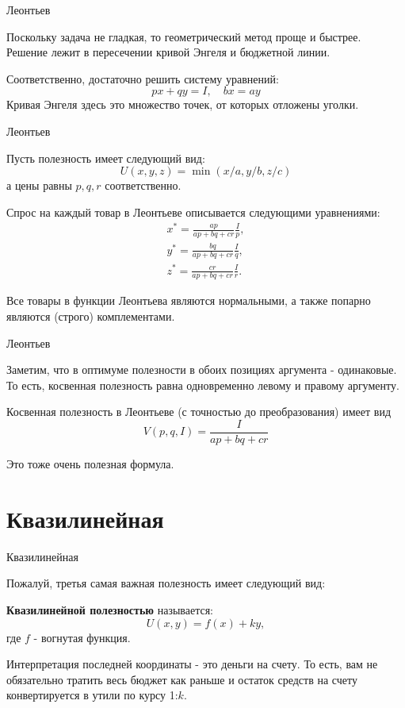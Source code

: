 \documentclass{beamer}
\begin{document}
\begin{frame}{Леонтьев}

Поскольку задача не гладкая, то геометрический метод проще и быстрее. Решение лежит в пересечении кривой Энгеля и бюджетной линии. 

Соответственно, достаточно решить систему уравнений:
$$ px + qy = I, \quad b x = a y$$
Кривая Энгеля здесь это множество точек, от которых отложены уголки.

\end{frame}

\begin{frame}{Леонтьев}

Пусть полезность имеет следующий вид:
$$U(x,y,z) = \min(x/a, y/b, z/c)$$ 
а цены равны $p, q, r$ соответственно. 

Спрос на каждый товар в Леонтьеве описывается следующими уравнениями:
\begin{gather*}
x^{\ast} = \frac{ap}{ap + bq + cr} \frac{I}{p}, \\
y^{\ast} = \frac{bq}{ap + bq + cr} \frac{I}{q}, \\
z^{\ast} = \frac{cr}{ap + bq + cr} \frac{I}{r}.
\end{gather*}

Все товары в функции Леонтьева являются нормальными, а также попарно являются (строго) комплементами.

\end{frame}

\begin{frame}{Леонтьев}

Заметим, что в оптимуме полезности в обоих позициях аргумента - одинаковые. То есть, косвенная полезность равна одновременно левому и правому аргументу.


Косвенная полезность в Леонтьеве (с точностью до преобразования) имеет вид
$$V(p,q,I) = \frac{I}{ap + bq + cr}$$

Это тоже очень полезная формула.

\end{frame}

\section{Квазилинейная}

\begin{frame}{Квазилинейная}

Пожалуй, третья самая важная полезность имеет следующий вид:

\begin{definition}
\textbf{Квазилинейной полезностью} называется:
$$U(x, y) = f(x) + k y,$$ 
где $f$ - вогнутая функция.
\end{definition}

Интерпретация последней координаты - это деньги на счету. То есть, вам не обязательно тратить весь бюджет как раньше и остаток средств на счету конвертируется в утили по курсу 1:$k$.

\end{frame}
\end{document}
